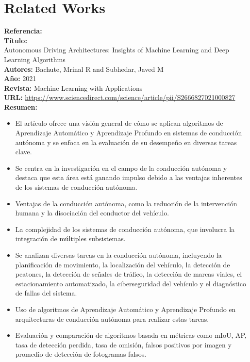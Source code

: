 \documentclass[10pt,letterpaper,final]{article}
\begin{document}
    \section*{Related Works}
    \newline
    \begin{longtable}
        \hline
        \noindent \textbf{Referencia:}~\cite{alam2022cost} \\
        \textbf{Título:} \\
        Autonomous Driving Architectures: Insights of Machine Learning and Deep Learning Algorithms \\
        \textbf{Autores:}
        Bachute, Mrinal R and Subhedar, Javed M \\
        \textbf{Año:}
        2021 \\
        \textbf{Revista:}
        Machine Learning with Applications \\
        \textbf{URL:}
        \url{https://www.sciencedirect.com/science/article/pii/S2666827021000827}
        \textbf{Resumen:}
        \begin{itemize}
            \item El artículo ofrece una visión general de cómo se aplican algoritmos de Aprendizaje Automático y Aprendizaje
            Profundo en sistemas de conducción autónoma y se enfoca en la evaluación de su desempeño en diversas tareas clave.
            \item Se centra en la investigación en el campo de la conducción autónoma y destaca que esta área está ganando
            impulso debido a las ventajas inherentes de los sistemas de conducción autónoma.
            \item Ventajas de la conducción autónoma, como la reducción de la intervención humana y la disociación del conductor del vehículo.
            \item La complejidad de los sistemas de conducción autónoma, que involucra la integración de múltiples subsistemas.
            \item Se analizan diversas tareas en la conducción autónoma, incluyendo la planificación de movimiento, la localización del vehículo,
            la detección de peatones, la detección de señales de tráfico, la detección de marcas viales, el estacionamiento automatizado,
            la ciberseguridad del vehículo y el diagnóstico de fallas del sistema.
            \item Uso de algoritmos de Aprendizaje Automático y Aprendizaje Profundo en arquitecturas de conducción autónoma para realizar estas tareas.
            \item Evaluación y comparación de algoritmos basada en métricas como mIoU, AP, tasa de detección perdida, tasa de omisión,
            falsos positivos por imagen y promedio de detección de fotogramas falsos.
        \end{itemize}


\end{longtable}
\end{document}
